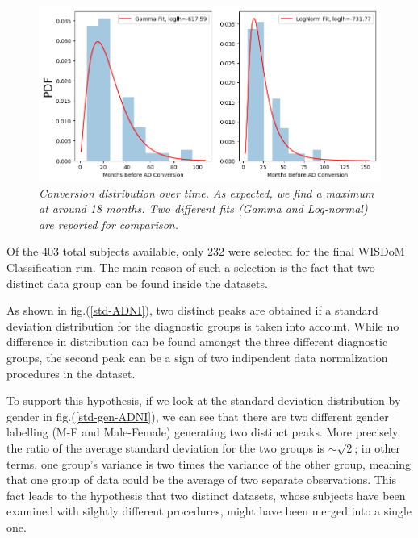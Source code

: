 \documentclass[12pt,openright,twoside,a4paper]{book}
\begin{document}
\begin{figure}[!h]
\centering
\includegraphics[scale=0.65]{conv-comp}
\caption{\textit{Conversion distribution over time. As expected, we find a maximum at around 18 months. Two different fits (Gamma and Log-normal) are reported for comparison.}}
\label{conv-comp}
\end{figure}

Of the 403 total subjects available, only 232 were selected for the final WISDoM Classification run.
The main reason of such a selection is the fact that two distinct data group can be found inside the datasets.

As shown in fig.(\ref{std-ADNI}), two distinct peaks are obtained if a standard deviation distribution for the diagnostic groups is taken into account.
While no difference in distribution can be found amongst the three different diagnostic groups, the second peak can be a sign of two indipendent data normalization procedures in the dataset.

To support this hypothesis, if we look at the standard deviation distribution by gender in fig.(\ref{std-gen-ADNI}), we can see that there are two different gender labelling (M-F and Male-Female) generating two distinct peaks. 
More precisely, the ratio of the average standard deviation for the two groups is $\sim \sqrt{2}$; in other terms, one group's variance is two times the variance of the other group, meaning that one group of data could be the average of two separate observations.
This fact leads to the hypothesis that two distinct datasets, whose subjects have been examined with silghtly different procedures, might have been merged into a single one.
\end{document}
